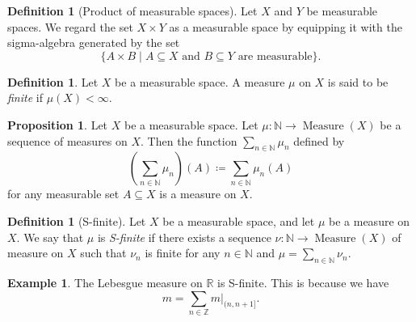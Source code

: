 \documentclass{article}
\theoremstyle{definition}
\newtheorem{proposition}[theorem]{Proposition}
\newtheorem{definition}[theorem]{Definition}
\newtheorem{example}[theorem]{Example}
\DeclareMathOperator{\Measure}{Measure}
\begin{document}
\begin{definition}[Product of measurable spaces]
  Let $X$ and $Y$ be measurable spaces.
  We regard the set $X \times Y$ as a measurable space
  by equipping it with the sigma-algebra generated by the set
  \begin{equation*}
    \{ A \times B \mid \text{$A \subseteq X$ and $B \subseteq Y$ are measurable} \}.
  \end{equation*}
\end{definition}

\begin{definition}
  Let $X$ be a measurable space.
  A measure $\mu$ on $X$ is said to be \emph{finite} if
  $\mu (X) < \infty$.
\end{definition}

\begin{proposition}
  Let $X$ be a measurable space.
  Let $\mu : \mathbb{N} \to \Measure (X)$ be a sequence of measures on $X$.
  Then the function $\sum_{n \in \mathbb{N}} \mu_n$ defined by
  \begin{equation*}
    \left( \sum_{n \in \mathbb{N}} \mu_n \right) (A)
      \coloneqq \sum_{n \in \mathbb{N}} \mu_n (A)
  \end{equation*}
  for any measurable set $A \subseteq X$
  is a measure on $X$.
\end{proposition}

\begin{definition}[S-finite]
  Let $X$ be a measurable space,
  and let $\mu$ be a measure on $X$.
  We say that $\mu$ is \emph{S-finite} if
  there exists a sequence 
  $\nu : \mathbb{N} \to \Measure (X)$ of measure on $X$ such that 
  $\nu_n$ is finite for any $n \in \mathbb{N}$
  and $\mu = \sum_{n \in \mathbb{N}} \nu_n$.
\end{definition}

\begin{example}
  The Lebesgue measure on $\mathbb{R}$ is S-finite.
  This is because we have
  \begin{equation*}
    m = \sum_{n \in \mathbb{Z}} m|_{(n, n+1]}.
  \end{equation*}
\end{example}

\end{document}
